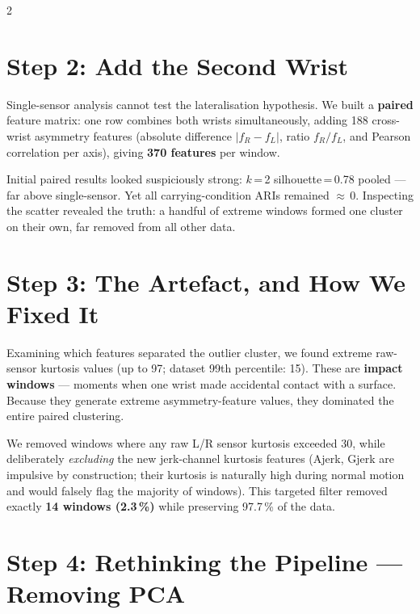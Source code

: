\documentclass[10pt,a4paper]{article}
\begin{document}
\begin{multicols}{2}
\section{Step 2: Add the Second Wrist}

Single-sensor analysis cannot test the lateralisation hypothesis.
We built a \textbf{paired} feature matrix: one row combines both wrists
simultaneously, adding 188 cross-wrist asymmetry features
(absolute difference $|f_R - f_L|$, ratio $f_R / f_L$, and Pearson correlation
per axis), giving \textbf{370 features} per window.

Initial paired results looked suspiciously strong: $k$\,=\,2 silhouette\,=\,0.78
pooled --- far above single-sensor.
Yet all carrying-condition ARIs remained $\approx$\,0.
Inspecting the scatter revealed the truth: a handful of extreme windows formed
one cluster on their own, far removed from all other data.

\section{Step 3: The Artefact, and How We Fixed It}

Examining which features separated the outlier cluster, we found extreme
raw-sensor kurtosis values (up to 97; dataset 99th percentile: 15).
These are \textbf{impact windows} --- moments when one wrist made accidental
contact with a surface.
Because they generate extreme asymmetry-feature values, they dominated the
entire paired clustering.

We removed windows where any raw L/R sensor kurtosis exceeded 30, while
deliberately \textit{excluding} the new jerk-channel kurtosis features
(Ajerk, Gjerk are impulsive by construction; their kurtosis is naturally
high during normal motion and would falsely flag the majority of windows).
This targeted filter removed exactly \textbf{14 windows (2.3\,\%)} while
preserving 97.7\,\% of the data.


\section{Step 4: Rethinking the Pipeline --- Removing PCA}


\end{multicols}
\end{document}
